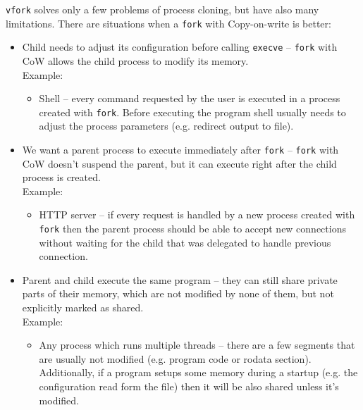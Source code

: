 \texttt{vfork} solves only a few problems of process cloning, but have also many limitations.
There are situations when a {\tt fork} with Copy-on-write is better:
\begin{itemize}
  \item Child needs to adjust its configuration before calling {\tt execve} -- {\tt fork} with CoW allows the child process to modify its memory.\\
    Example:
    \begin{itemize}
      \item Shell -- every command requested by the user is executed in a process created with {\tt fork}.
        Before executing the program shell usually needs to adjust the process parameters (e.g. redirect output to file).
    \end{itemize}
  \item We want a parent process to execute immediately after {\tt fork} -- {\tt fork} with CoW doesn't suspend the parent, but it can execute
    right after the child process is created.\\
    Example:
    \begin{itemize}
      \item HTTP server -- if every request is handled by a new process created with {\tt fork} then the parent process should be able
        to accept new connections without waiting for the child that was delegated to handle previous connection.
    \end{itemize}
  \item Parent and child execute the same program -- they can still share private parts of their memory,
    which are not modified by none of them, but not explicitly marked as shared. \\
    Example:
    \begin{itemize}
      \item Any process which runs multiple threads -- there are a few segments that are usually not modified (e.g. program code or rodata section).
        Additionally, if a program setups some memory during a startup (e.g. the configuration read form the file) then it will be also shared unless it's modified.
    \end{itemize}
\end{itemize}

